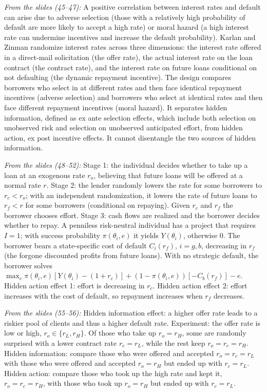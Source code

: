 \documentclass[11pt,a4paper]{article}
\begin{document}
\emph{From the slides (45--47):} A positive correlation between interest rates and default can arise
due to adverse selection (those with a relatively high probability of default are more likely to
accept a high rate) or moral hazard (a high interest rate can undermine incentives and increase the
default probability). Karlan and Zinman randomize interest rates across three dimensions: the
interest rate offered in a direct-mail solicitation (the offer rate), the actual interest rate on
the loan contract (the contract rate), and the interest rate on future loans conditional on not
defaulting (the dynamic repayment incentive). The design compares borrowers who select in at
different rates and then face identical repayment incentives (adverse selection) and borrowers who
select at identical rates and then face different repayment incentives (moral hazard). It separates
hidden information, defined as ex ante selection effects, which include both selection on unobserved
risk and selection on unobserved anticipated effort, from hidden action, ex post incentive effects.
It cannot disentangle the two sources of hidden information.

\emph{From the slides (48--52):} Stage 1: the individual decides whether to take up a loan at an
exogenous rate \(r_o\), believing that future loans will be offered at a normal rate \(r\). Stage 2:
the lender randomly lowers the rate for some borrowers to \(r_c < r_o\); with an independent
randomization, it lowers the rate of future loans to \(r_f < r\) for some borrowers (conditional on
repaying). Given \(r_c\) and \(r_f\) the borrower chooses effort. Stage 3: cash flows are realized
and the borrower decides whether to repay. A penniless risk-neutral individual has a project that
requires \(I = 1\); with success probability \(\pi(\theta_i, e)\) it yields \(Y(\theta_i)\),
otherwise \(0\). The borrower bears a state-specific cost of default \(C_i(r_f)\), \(i = g, b\),
decreasing in \(r_f\) (the forgone discounted profits from future loans). With no strategic default,
the borrower solves
\(\max_e \pi(\theta_i, e)[Y(\theta_i) - (1 + r_c)] + (1 - \pi(\theta_i, e))[-C_b(r_f)] - e\). Hidden
action effect 1: effort is decreasing in \(r_c\). Hidden action effect 2: effort increases with the
cost of default, so repayment increases when \(r_f\) decreases.

\emph{From the slides (55--56):} Hidden information effect: a higher offer rate leads to a riskier
pool of clients and thus a higher default rate. Experiment: the offer rate is low or high,
\(r_o \in \{r_L, r_H\}\). Of those who take up \(r_o = r_H\), some are randomly surprised with a
lower contract rate \(r_c = r_L\), while the rest keep \(r_o = r_c = r_H\). Hidden information:
compare those who were offered and accepted \(r_o = r_c = r_L\) with those who were offered and
accepted \(r_o = r_H\) but ended up with \(r_c = r_L\). Hidden action: compare those who took up the
high rate and kept it, \(r_o = r_c = r_H\), with those who took up \(r_o = r_H\) but ended up with
\(r_c = r_L\).
\end{document}
